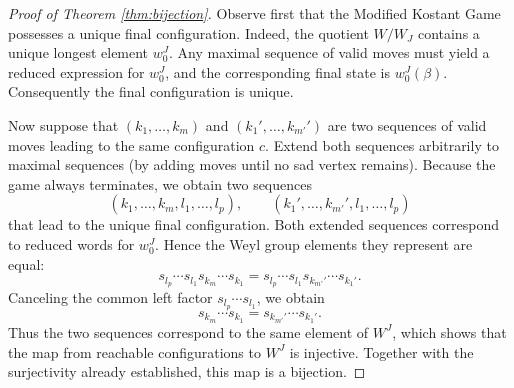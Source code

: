 \documentclass[11pt,a4paper]{amsart}
\theoremstyle{plain}
\theoremstyle{definition}
\theoremstyle{remark}
\begin{document}
\begin{proof}[Proof of Theorem \ref{thm:bijection}]
    Observe first that the Modified Kostant Game possesses a unique final configuration. Indeed, the quotient $W/W_J$ contains a unique longest element $w_0^J$. Any maximal sequence of valid moves must yield a reduced expression for $w_0^J$, and the corresponding final state is $w_0^J(\beta)$. Consequently the final configuration is unique.

    Now suppose that $(k_1,\dots,k_m)$ and $(k_1',\dots,k_{m'}')$ are two sequences of valid moves leading to the same configuration $c$. Extend both sequences arbitrarily to maximal sequences (by adding moves until no sad vertex remains). Because the game always terminates, we obtain two sequences
    \[
    (k_1,\dots,k_m,l_1,\dots,l_p),\qquad (k_1',\dots,k_{m'}',l_1,\dots,l_p)
    \]
    that lead to the unique final configuration. Both extended sequences correspond to reduced words for $w_0^J$. Hence the Weyl group elements they represent are equal:
    \[
    s_{l_p}\cdots s_{l_1}s_{k_m}\cdots s_{k_1} = s_{l_p}\cdots s_{l_1}s_{k_{m'}'}\cdots s_{k_1'}.
    \]
    Canceling the common left factor $s_{l_p}\cdots s_{l_1}$, we obtain
    \[
    s_{k_m}\cdots s_{k_1} = s_{k_{m'}'}\cdots s_{k_1'}.
    \]
    Thus the two sequences correspond to the same element of $W^J$, which shows that the map from reachable configurations to $W^J$ is injective. Together with the surjectivity already established, this map is a bijection.
\end{proof}
\end{document}
